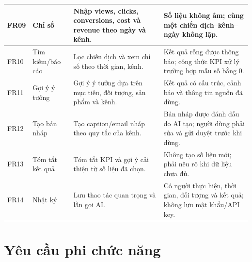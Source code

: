 \begin{table}[!htbp]
\begin{tabularx}{\textwidth}{|C{1.1cm}|L{2.2cm}|L{4.5cm}|Y|}
\hline
FR09 & Chỉ số & Nhập views, clicks, conversions, cost và revenue theo ngày và kênh. & Số liệu không âm; cùng một chiến dịch--kênh--ngày không lặp.\\
\hline
FR10 & Tìm kiếm/báo cáo & Lọc chiến dịch và xem chỉ số theo thời gian, kênh. & Kết quả rỗng được thông báo; công thức KPI xử lý trường hợp mẫu số bằng 0.\\
\hline
FR11 & Gợi ý ý tưởng & Gợi ý ý tưởng dựa trên mục tiêu, đối tượng, sản phẩm và kênh. & Kết quả có cấu trúc, cảnh báo và thông tin nguồn đã dùng.\\
\hline
FR12 & Tạo bản nháp & Tạo caption/email nháp theo quy tắc của kênh. & Bản nháp được đánh dấu do AI tạo; người dùng phải sửa và gửi duyệt trước khi dùng.\\
\hline
FR13 & Tóm tắt kết quả & Tóm tắt KPI và gợi ý cải thiện từ số liệu đã chọn. & Không tạo số liệu mới; phải nêu rõ khi dữ liệu chưa đủ.\\
\hline
FR14 & Nhật ký & Lưu thao tác quan trọng và lần gọi AI. & Có người thực hiện, thời gian, đối tượng và kết quả; không lưu mật khẩu/API key.\\
\hline
\end{tabularx}
\end{table}

\clearpage
\section{Yêu cầu phi chức năng}

